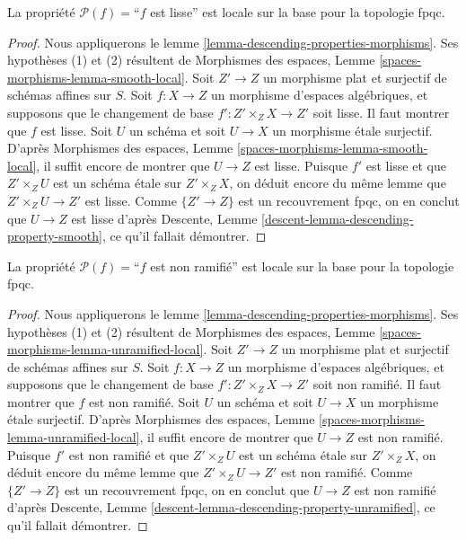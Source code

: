 \begin{lemma}
\label{lemma-descending-property-smooth}
La propriété $\mathcal{P}(f) =$``$f$ est lisse''
est locale sur la base pour la topologie fpqc.
\end{lemma}

\begin{proof}
Nous appliquerons le
lemme \ref{lemma-descending-properties-morphisms}.
Ses hypothèses (1) et (2) résultent de
Morphismes des espaces,
Lemme \ref{spaces-morphisms-lemma-smooth-local}.
Soit $Z' \to Z$ un morphisme plat et surjectif de schémas affines sur $S$.
Soit $f : X \to Z$ un morphisme d'espaces algébriques, et supposons
que le changement de base $f' : Z' \times_Z X \to Z'$ soit lisse.
Il faut montrer que $f$ est lisse. Soit $U$ un schéma
et soit $U \to X$ un morphisme étale surjectif. D'après
Morphismes des espaces,
Lemme \ref{spaces-morphisms-lemma-smooth-local},
il suffit encore de montrer que $U \to Z$ est lisse.
Puisque $f'$ est lisse et que $Z' \times_Z U$ est un
schéma étale sur $Z' \times_Z X$, on déduit encore du même lemme que
$Z' \times_Z U \to Z'$ est lisse.
Comme $\{Z' \to Z\}$ est un recouvrement fpqc, on en conclut que
$U \to Z$ est lisse d'après
Descente, Lemme \ref{descent-lemma-descending-property-smooth},
ce qu'il fallait démontrer.
\end{proof}

\begin{lemma}
\label{lemma-descending-property-unramified}
La propriété $\mathcal{P}(f) =$``$f$ est non ramifié''
est locale sur la base pour la topologie fpqc.
\end{lemma}

\begin{proof}
Nous appliquerons le
lemme \ref{lemma-descending-properties-morphisms}.
Ses hypothèses (1) et (2) résultent de
Morphismes des espaces,
Lemme \ref{spaces-morphisms-lemma-unramified-local}.
Soit $Z' \to Z$ un morphisme plat et surjectif de schémas affines sur $S$.
Soit $f : X \to Z$ un morphisme d'espaces algébriques, et supposons
que le changement de base $f' : Z' \times_Z X \to Z'$ soit non ramifié.
Il faut montrer que $f$ est non ramifié. Soit $U$ un schéma
et soit $U \to X$ un morphisme étale surjectif. D'après
Morphismes des espaces,
Lemme \ref{spaces-morphisms-lemma-unramified-local},
il suffit encore de montrer que $U \to Z$ est non ramifié.
Puisque $f'$ est non ramifié et que $Z' \times_Z U$ est un
schéma étale sur $Z' \times_Z X$, on déduit encore du même lemme que
$Z' \times_Z U \to Z'$ est non ramifié.
Comme $\{Z' \to Z\}$ est un recouvrement fpqc, on en conclut que
$U \to Z$ est non ramifié d'après
Descente, Lemme \ref{descent-lemma-descending-property-unramified},
ce qu'il fallait démontrer.
\end{proof}

